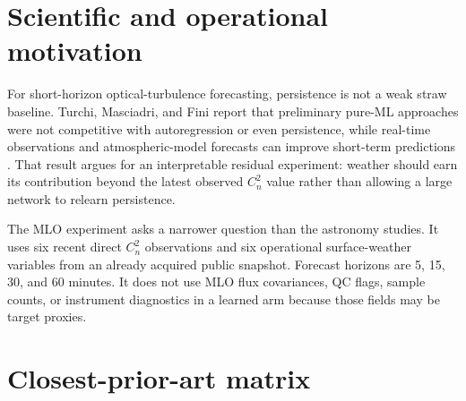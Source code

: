 \documentclass[10pt]{article}
\newcommand{\cn}{\(C_n^2\)}
\begin{document}
\section{Scientific and operational motivation}

For short-horizon optical-turbulence forecasting, persistence is not a weak
straw baseline. Turchi, Masciadri, and Fini report that preliminary pure-ML
approaches were not competitive with autoregression or even persistence, while
real-time observations and atmospheric-model forecasts can improve short-term
predictions \cite{turchi2022optical}. That result argues for an interpretable
residual experiment: weather should earn its contribution beyond the latest
observed \cn{} value rather than allowing a large network to relearn
persistence.

The MLO experiment asks a narrower question than the astronomy studies. It
uses six recent direct \cn{} observations and six operational surface-weather
variables from an already acquired public snapshot. Forecast horizons are 5,
15, 30, and 60 minutes. It does not use MLO flux covariances, QC flags, sample
counts, or instrument diagnostics in a learned arm because those fields may
be target proxies.

\section{Closest-prior-art matrix}
\end{document}
